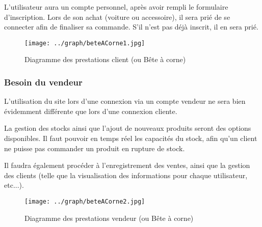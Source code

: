 \documentclass[a4paper]{article}
\begin{document}
	L'utilisateur aura un compte personnel, après avoir rempli le formulaire d'inscription. Lors de son achat (voiture ou accessoire), il sera prié de se connecter afin de finaliser sa commande. S'il n'est pas déjà inscrit, il en sera prié.
	
		\begin{figure}[!h]
		\centering
			\texttt{[image: ../graph/beteACorne1.jpg]}
			\caption{Diagramme des prestations client (ou Bête à corne)}
	\end{figure}
		\newpage
		\subsubsection{Besoin du vendeur}
		L'utilisation du site lors d'une connexion via un compte vendeur ne sera bien évidemment différente que lors d'une connexion cliente.
		
		La gestion des stocks ainsi que l'ajout de nouveaux produits seront des options disponibles. Il faut pouvoir en temps réel les capacités du stock, afin qu'un client ne puisse pas commander un produit en rupture de stock.
		
		Il faudra également procéder à l'enregistrement des ventes, ainsi que la gestion des clients (telle que la visualisation des informations pour chaque utilisateur, etc...).
	
	\begin{figure}[!h]
		\centering
			\texttt{[image: ../graph/beteACorne2.jpg]}
			\caption{Diagramme des prestations vendeur (ou Bête à corne)}
	\end{figure}
	
	\newpage
	\newpage
\end{document}
